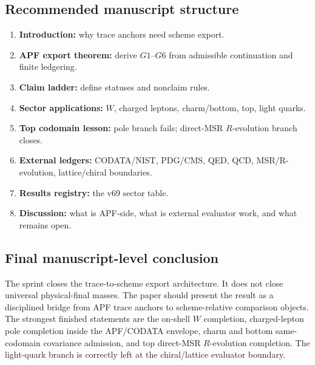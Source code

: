 \subsection{Recommended manuscript structure}
\begin{enumerate}
\item \textbf{Introduction:} why trace anchors need scheme export.
\item \textbf{APF export theorem:} derive $G1$--$G6$ from admissible continuation and finite ledgering.
\item \textbf{Claim ladder:} define statuses and nonclaim rules.
\item \textbf{Sector applications:} $W$, charged leptons, charm/bottom, top, light quarks.
\item \textbf{Top codomain lesson:} pole branch fails; direct-MSR $R$-evolution branch closes.
\item \textbf{External ledgers:} CODATA/NIST, PDG/CMS, QED, QCD, MSR/R-evolution, lattice/chiral boundaries.
\item \textbf{Results registry:} the v69 sector table.
\item \textbf{Discussion:} what is APF-side, what is external evaluator work, and what remains open.
\end{enumerate}

\subsection{Final manuscript-level conclusion}
The sprint closes the trace-to-scheme export architecture.  It does not close universal physical-final masses.  The paper should present the result as a disciplined bridge from APF trace anchors to scheme-relative comparison objects.  The strongest finished statements are the on-shell $W$ completion, charged-lepton pole completion inside the APF/CODATA envelope, charm and bottom same-codomain covariance admission, and top direct-MSR $R$-evolution completion.  The light-quark branch is correctly left at the chiral/lattice evaluator boundary.

\begin{center}
\end{center}
